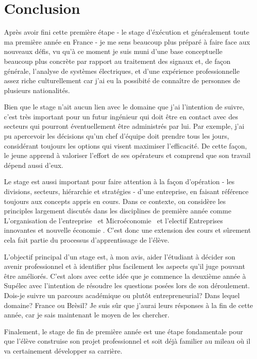 \documentclass{article}
\begin{document}
\newpage
\section{Conclusion}

Après avoir fini cette première étape - le stage d'éxécution et généralement
toute ma première année en France - je me sens beaucoup plus préparé à faire
face aux nouveaux défis, vu qu'à ce moment je suis muni d'une base
conceptuelle beaucoup plus concrète par rapport au traitement des
signaux et, de façon générale, l'analyse de systèmes électriques, et d'une
expérience professionnelle assez riche culturellement car j'ai eu la possibité
de connaître de personnes de plusieurs nationalités.

\vspace{12pt}

Bien que le stage n'ait aucun lien avec le domaine que j'ai l'intention de
suivre, c'est très important pour un futur ingénieur qui doit être en contact
avec des secteurs qui pourront éventuellement être administrés par lui.
Par exemple, j'ai pu apercevoir les décisions qu'un chef d'équipe doit prendre
tous les jours, considérant toujours les options qui visent maximiser
l'efficacité. De cette façon, le jeune apprend à valoriser l'effort de ses
opérateurs et comprend que son travail dépend aussi d'eux.

\vspace{12pt}

Le stage est aussi important pour faire attention à la façon d'opération - les
divisions, secteurs, hiérarchie et stratégies -  d'une entreprise, en faisant
référence toujours aux concepts appris en cours. Dans ce contexte, on
considère les principles largement discutés dans les disciplines de première
année comme \og L'organisation de l'entreprise \fg ~et \og Microéconomie \fg ~et
l'electif \og Entreprises innovantes et nouvelle économie \fg. C'est donc une
extension des cours et sûrement cela fait partie du processus d'apprentissage de
l'élève.

\vspace{12pt}

L'objectif principal d'un stage est, à mon avis, aider l'étudiant à décider son
avenir professionnel et à identifier plus facilement les aspects qu'il juge
pouvant être améliorés. C'est alors avec cette idée que je commence la deuxième
année à Supélec avec l'intention de résoudre les questions posées lors de son
déroulement. Dois-je suivre un parcours académique ou plutôt entrepreneurial?
Dans lequel domaine? France ou Brèsil? Je suis sûr que j'aurai leurs résponses à
la fin de cette année, car je sais maintenant le moyen de les chercher.

\vspace{12pt}

Finalement, le stage de fin de première année est une étape fondamentale pour
que l'élève construise son projet professionnel et soit déjà familier au mileau
où il va certainement développer sa carrière.
\end{document}
